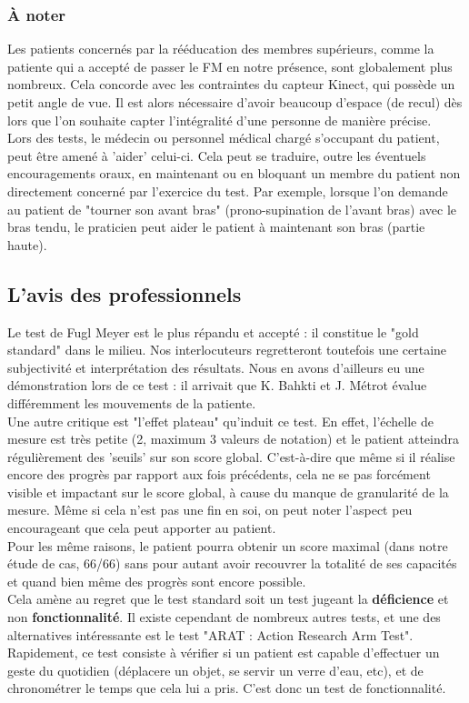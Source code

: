 \documentclass[french,12pt]{report}
\begin{document}
				\subsubsection{À noter}
Les patients concernés par la rééducation des membres supérieurs, comme la patiente qui a accepté de passer le FM en notre présence, sont globalement plus nombreux. Cela concorde avec les contraintes du capteur Kinect, qui possède un petit angle de vue. Il est alors nécessaire d'avoir beaucoup d'espace (de recul) dès lors que l'on souhaite capter l'intégralité d'une personne de manière précise. \\
Lors des tests, le médecin ou personnel médical chargé s'occupant du patient, peut être amené à 'aider' celui-ci. Cela peut se traduire, outre les éventuels encouragements oraux, en maintenant ou en bloquant un membre du patient non directement concerné par l'exercice du test. Par exemple, lorsque l'on demande au patient de "tourner son avant bras" (prono-supination de l'avant bras) avec le bras tendu, le praticien peut aider le patient à maintenant son bras (partie haute).
		
	\subsection{L'avis des professionnels}
	Le test de Fugl Meyer est le plus répandu et accepté : il constitue le "gold standard" dans le milieu. Nos interlocuteurs regretteront toutefois une certaine subjectivité et interprétation des résultats. Nous en avons d'ailleurs eu une démonstration lors de ce test : il arrivait que K. Bahkti et J. Métrot évalue différemment les mouvements de la patiente. \\
Une autre critique est "l'effet plateau" qu'induit ce test. En effet, l'échelle de mesure est très petite (2, maximum 3 valeurs de notation) et le patient atteindra régulièrement des 'seuils' sur son score global. C'est-à-dire que même si il réalise encore des progrès par rapport aux fois précédents, cela ne se pas forcément visible et impactant sur le score global, à cause du manque de granularité de la mesure. Même si cela n'est pas une fin en soi, on peut noter l'aspect peu encourageant que cela peut apporter au patient. \\
Pour les même raisons, le patient pourra obtenir un score maximal (dans notre étude de cas, 66/66) sans pour autant avoir recouvrer la totalité de ses capacités et quand bien même des progrès sont encore possible. \\
Cela amène au regret que le test standard soit un test jugeant la \textbf{déficience} et non \textbf{fonctionnalité}. Il existe cependant de nombreux autres tests, et une des alternatives intéressante est le test "ARAT : Action Research Arm Test". %
Rapidement, ce test consiste à vérifier si un patient est capable d'effectuer un geste du quotidien (déplacere un objet, se servir un verre d'eau, etc), et de chronométrer le temps que cela lui a pris. C'est donc un test de fonctionnalité.
		
\end{document}
